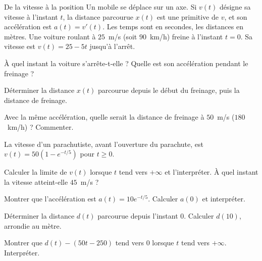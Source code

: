 \begin{exercice}[3]{De la vitesse à la position}
Un mobile se déplace sur un axe. Si $v(t)$ désigne sa vitesse à l'instant $t$, la distance parcourue $x(t)$ est une primitive
de $v$, et son accélération est $a(t)=v'(t)$. Les temps sont en secondes, les distances en mètres.
Une voiture roulant à $25$~m/s (soit $90$~km/h) freine à l'instant $t=0$. Sa vitesse est $v(t)=25-5t$ jusqu'à l'arrêt.
\begin{questions}
  \item À quel instant la voiture s'arrête-t-elle ? Quelle est son accélération pendant le freinage ?
  \item Déterminer la distance $x(t)$ parcourue depuis le début du freinage, puis la distance de freinage.
  \item Avec la même accélération, quelle serait la distance de freinage à $50$~m/s ($180$~km/h) ? Commenter.
\end{questions}
La vitesse d'un parachutiste, avant l'ouverture du parachute, est $v(t)=50\left(1-e^{-t/5}\right)$ pour $t\geq0$.
\begin{questions}[resume]
  \item Calculer la limite de $v(t)$ lorsque $t$ tend vers $+\infty$ et l'interpréter. À quel instant la vitesse atteint-elle $45$~m/s ?
  \item Montrer que l'accélération est $a(t)=10e^{-t/5}$. Calculer $a(0)$ et interpréter.
  \item Déterminer la distance $d(t)$ parcourue depuis l'instant $0$. Calculer $d(10)$, arrondie au mètre.
  \item Montrer que $d(t)-(50t-250)$ tend vers $0$ lorsque $t$ tend vers $+\infty$. Interpréter.
\end{questions}
\end{exercice}

